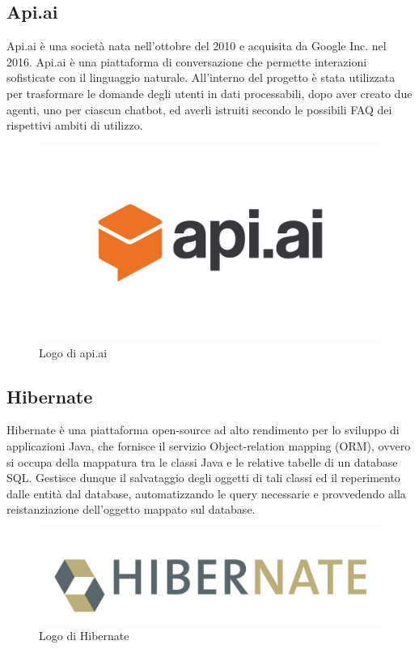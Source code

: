 \subsection{Api.ai}
Api.ai è una società nata nell'ottobre del 2010 e acquisita da Google Inc. nel 2016. Api.ai è una piattaforma di conversazione
che permette interazioni sofisticate con il linguaggio naturale. All'interno del progetto è stata utilizzata per trasformare le domande degli utenti in dati processabili, dopo aver creato due agenti, uno per ciascun \gls{chatbot}, ed averli istruiti secondo le possibili FAQ dei rispettivi ambiti di utilizzo.
\begin{figure}[!h]
	\centering
	\includegraphics[scale=0.2]{../Immagini/apiai.png}
	\caption{Logo di api.ai}
\end{figure}
\subsection{Hibernate}
Hibernate è una piattaforma open-source ad alto rendimento per lo sviluppo di applicazioni Java, che fornisce il servizio Object-relation mapping (ORM), ovvero si occupa della mappatura tra le classi Java e le relative tabelle di un database SQL.
Gestisce dunque il salvataggio degli oggetti di tali classi ed il reperimento dalle entità dal database, automatizzando le query necessarie e provvedendo alla reistanziazione dell’oggetto mappato sul database.
\begin{figure}[!h]
	\centering
	\includegraphics[scale=0.35]{../Immagini/Hibernate.png}
	\caption{Logo di Hibernate}
\end{figure}
